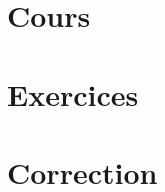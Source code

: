\documentclass[a4paper, 14px, fleqn]{article}
\begin{document}
    
    \clearpage
    
    \tableofcontents
    \clearpage
    
    \section{Cours}
    
    \clearpage
    
    \section{Exercices}
    
    \clearpage
    
    \section{Correction}
    
    \clearpage
\end{document}
